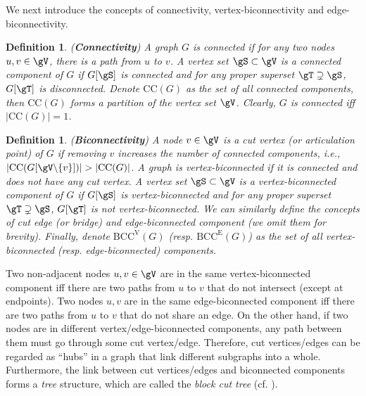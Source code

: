 \documentclass{article} %
\let\cref\crtcref
\newtheorem{definition}[theorem]{Definition}
\begin{document}
We next introduce the concepts of connectivity, vertex-biconnectivity and edge-biconnectivity.

\begin{definition}
\label{connectivity}
\normalfont (\textbf{Connectivity}) A graph $G$ is \emph{connected} if for any two nodes $u,v\in\gV$, there is a path from $u$ to $v$. A vertex set $\gS\subset\gV$ is a \emph{connected component} of $G$ if $G[\gS]$ is connected and for any proper superset $\gT\supsetneq\gS$, $G[\gT]$ is disconnected. Denote $\mathrm{CC}(G)$ as the set of all connected components, then $\mathrm{CC}(G)$ forms a \emph{partition} of the vertex set $\gV$. Clearly, $G$ is connected iff $|\mathrm{CC}(G)|=1$.
\end{definition}

\begin{definition}
\label{vertex_biconnectivity}
\normalfont (\textbf{Biconnectivity}) A node $v\in\gV$ is a \emph{cut vertex} (or \emph{articulation point}) of $G$ if removing $v$ increases the number of connected components, i.e., $|\mathrm{CC}(G[\gV\backslash\{v\}])|>|\mathrm{CC}(G)|$. A graph is \emph{vertex-biconnected} if it is connected and does not have any cut vertex. A vertex set $\gS\subset\gV$ is a \emph{vertex-biconnected component} of $G$ if $G[\gS]$ is vertex-biconnected and for any proper superset $\gT\supsetneq\gS$, $G[\gT]$ is not vertex-biconnected. We can similarly define the concepts of \emph{cut edge} (or \emph{bridge}) and \emph{edge-biconnected component} (we omit them for brevity). Finally, denote $\mathrm{BCC}^\mathrm{V}(G)$ (resp. $\mathrm{BCC}^\mathrm{E}(G)$) as the set of all vertex-biconnected (resp. edge-biconnected) components.
\end{definition}

\vspace{-4pt}

Two non-adjacent nodes $u,v\in\gV$ are in the same vertex-biconnected component iff there are two paths from $u$ to $v$ that do not intersect (except at endpoints). Two nodes $u,v$ are in the same edge-biconnected component iff there are two paths from $u$ to $v$ that do not share an edge. On the other hand, if two nodes are in different vertex/edge-biconnected components, any path between them must go through some cut vertex/edge. Therefore, cut vertices/edges can be regarded as ``hubs'' in a graph that link different subgraphs into a whole. Furthermore, the link between cut vertices/edges and biconnected components forms a \emph{tree} structure, which are called the \emph{block cut tree} (cf. \cref{fig:block_cut_tree}).
\end{document}
